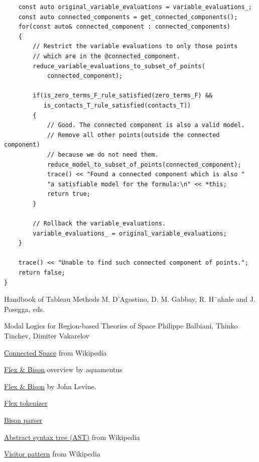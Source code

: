\documentclass{article}
\begin{document}
\begin{lstlisting}
    const auto original_variable_evaluations = variable_evaluations_;
    const auto connected_components = get_connected_components();
    for(const auto& connected_component : connected_components)
    {
        // Restrict the variable evaluations to only those points
        // which are in the @connected_component.
        reduce_variable_evaluations_to_subset_of_points(
            connected_component);

        if(is_zero_terms_F_rule_satisfied(zero_terms_F) &&
           is_contacts_T_rule_satisfied(contacts_T))
        {
            // Good. The connected component is also a valid model.
            // Remove all other points(outside the connected component)
            // because we do not need them.
            reduce_model_to_subset_of_points(connected_component);
            trace() << "Found a connected component which is also "
            "a satisfiable model for the formula:\n" << *this;
            return true;
        }

        // Rollback the variable_evaluations.
        variable_evaluations_ = original_variable_evaluations;
    }

    trace() << "Unable to find such connected component of points.";
    return false;
}
\end{lstlisting}

	\newpage

	\cleardoublepage


	\begin{thebibliography}{9}

			Handbook of Tableau Methods
			M. D’Agostino, D. M. Gabbay, R. H¨ahnle and J. Posegga, eds.

			Modal Logics for Region-based Theories of Space
			Philippe Balbiani, Thinko Tinchev, Dimiter Vakarelov

			\href{https://en.wikipedia.org/wiki/Connected_space}{Connected Space} from Wikipedia

			\href{https://aquamentus.com/flex_bison.html#0}{Flex \& Bison} overview by aquamentus

			\href{https://www.amazon.com/flex-bison-Text-Processing-Tools/dp/0596155972/ref=sr_1_1}{Flex \& Bison} by John Levine.

			\href{https://www.cs.princeton.edu/~appel/modern/c/software/flex/flex.html}{Flex tokenizer}

			\href{https://www.gnu.org/software/bison/}{Bison parser}

			\href{https://en.wikipedia.org/wiki/Abstract_syntax_tree}{Abstract syntax tree (AST)} from Wikipedia

			\href{https://en.wikipedia.org/wiki/Visitor_pattern}{Visitor pattern} from Wikipedia

	\end{thebibliography}
\end{document}
